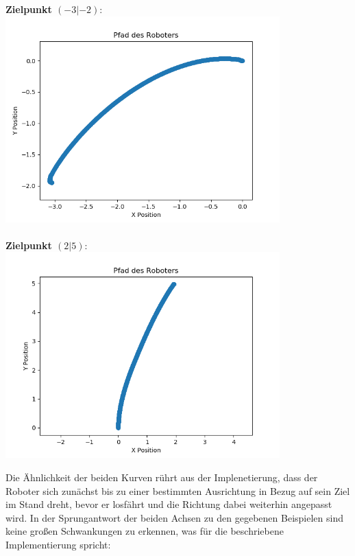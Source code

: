 \documentclass[12pt, a4paper]{report}
\begin{document}
\begin{centering}
{\textbf{Zielpunkt $(-3|-2):$}}\\
\includegraphics[width=300pt]{homing_example1.png}\\
~\\
{\textbf{Zielpunkt $(2|5):$}}\\
\includegraphics[width=300pt]{homing_example2.png}\\
\end{centering}

Die Ähnlichkeit der beiden Kurven rührt aus der Implenetierung, dass der Roboter sich zunächst bis zu einer bestimmten Ausrichtung in Bezug auf sein Ziel im Stand dreht, bevor er losfährt und die Richtung dabei weiterhin angepasst wird.\newline
In der Sprungantwort der beiden Achsen zu den gegebenen Beispielen sind keine großen Schwankungen zu erkennen, was für die beschriebene Implementierung spricht:\newline
\end{document}
